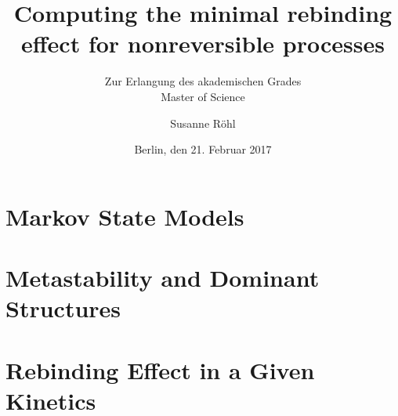 \documentclass[
  12pt,
  a4paper,
  pdftex,
  oneside,
  DIVcalc,
  openright
  ] {scrreprt}
\begin{document}
\subject{Master thesis}
\title{Computing the minimal rebinding effect for nonreversible processes}
\subtitle{Zur Erlangung des akademischen Grades\\
  Master of Science}
\author{ \small Susanne R\"ohl}
\date{Berlin, den 21. Februar 2017}
\maketitle

\tableofcontents


\nocite{*}
%  
%  
%  

\chapter{Markov State Models}
  
  
  
  

\chapter{Metastability and Dominant Structures}
  
  
  
  

\chapter{Rebinding Effect in a Given Kinetics}
  
\end{document}
